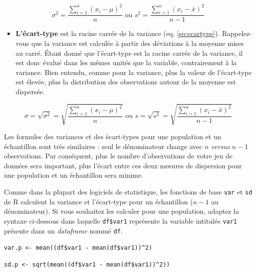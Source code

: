 \documentclass[
  11pt,
  french,
]{book}
\makeatletter
\providecommand{\tightlist}{%
  \setlength{\itemsep}{0pt}\setlength{\parskip}{0pt}}
\newenvironment{kframev}{%
\medskip{}
\setlength{\fboxsep}{.8em}
 \def\at@end@of@kframev{}%
 \ifinner\ifhmode%
  \def\at@end@of@kframev{\end{minipage}}%
  \begin{minipage}{\columnwidth}%
 \fi\fi%
 \def\FrameCommand##1{\hskip\@totalleftmargin \hskip-\fboxsep
 \colorbox{shadebluecolor}{##1}\hskip-\fboxsep
     \hskip-\linewidth \hskip-\@totalleftmargin \hskip\columnwidth}%
 \MakeFramed {\advance\hsize-\width
   \@totalleftmargin\z@ \linewidth\hsize
   \@setminipage}}%
 {\par\unskip\endMakeFramed%
 \at@end@of@kframev}
\newenvironment{rmdblock}[1]
  {
  \begin{itemize}
  \renewcommand{\labelitemi}{
    \raisebox{-.7\height}[0pt][0pt]{
      {\setkeys{Gin}{width=3em,keepaspectratio}\texttt{[image: images/\#1]}}
    }
  }
  \setlength{\fboxsep}{1em}
  \begin{kframev}
  \small
  \item
  }
  {
  \end{kframev}
  \end{itemize}
  }
\newenvironment{bloc_notes}
  {\begin{rmdblock}{notes}}
  {\end{rmdblock}}
\makeatother
\begin{document}
\begin{equation} 
\sigma^2=\frac{\sum_{i=1}^n (x_{i}-\mu)^2}{n} \text{ ou } s^2=\frac{\sum_{i=1}^n (x_{i}-\bar{x})^2}{n-1}
\label{eq:variance}
\end{equation}

\begin{itemize}
\tightlist
\item
  \textbf{L'écart-type} est la racine carrée de la variance (eq. \eqref{eq:ecartype}). Rappelez-vous que la variance est calculée à partir des déviations à la moyenne mises au carré. Étant donné que l'écart-type est la racine carrée de la variance, il est donc évalué dans les mêmes unités que la variable, contrairement à la variance. Bien entendu, comme pour la variance, plus la valeur de l'écart-type est élevée, plus la distribution des observations autour de la moyenne est dispersée.
\end{itemize}

\begin{equation} 
\sigma=\sqrt{\sigma^2}=\sqrt{\frac{\sum_{i=1}^n (x_{i}-\mu)^2}{n}} \text{ ou } s=\sqrt{s^2}=\sqrt{\frac{\sum_{i=1}^n (x_{i}-\bar{x})^2}{n-1}}
\label{eq:ecartype}
\end{equation}

\begin{bloc_notes}

Les formules des variances et des écart-types pour une population et un échantillon sont très similaires : seul le dénominateur change avec \(n\) \emph{versus} \(n-1\) observations. Par conséquent, plus le nombre d'observations de votre jeu de données sera important, plus l'écart entre ces deux mesures de dispersion pour une population et un échantillon sera minime.

Comme dans la plupart des logiciels de statistique, les fonctions de base \texttt{var} et \texttt{sd} de R calculent la variance et l'écart-type pour un échantillon (\(n-1\) au dénominateur). Si vous souhaitez les calculer pour une population, adaptez la syntaxe ci-dessous dans laquelle \texttt{df\$var1} représente la variable intitulée \texttt{var1} présente dans un \emph{dataframe} nommé \texttt{df}.

\texttt{var.p\ \textless{}-\ mean((df\$var1\ -\ mean(df\$var1))\^{}2)}

\texttt{sd.p\ \textless{}-\ sqrt(mean((df\$var1\ -\ mean(df\$var1))\^{}2))}

\end{bloc_notes}
\end{document}
